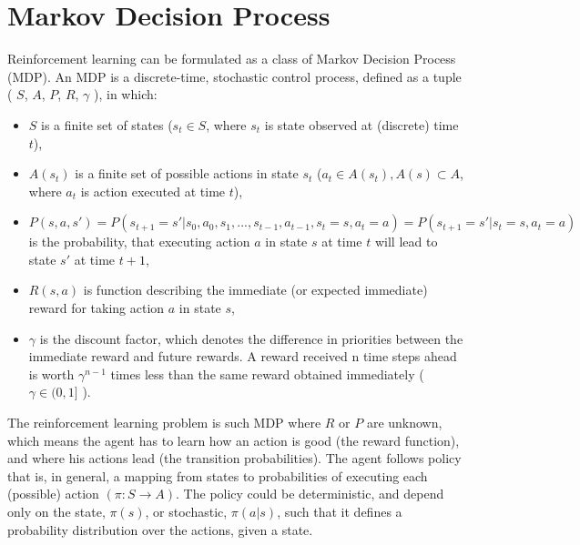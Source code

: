	\section{Markov Decision Process} \label{sec:21}
	    Reinforcement learning can be formulated as a class of Markov Decision Process (MDP). An MDP is a discrete-time, stochastic control process, defined as a tuple ( $S$, $A$, $P$, $R$, $\gamma$ ), in which:
	    \begin{itemize}
	        \item $S$ is a finite set of states ($s_t \in S$, where $s_t$ is state observed at (discrete) time $t$),
	        \item $A(s_t )$ is a finite set of possible actions in state $s_t$ ($a_t \in A(s_t ), A(s) \subset A$, where $a_t$ is action executed at time $t$),
	        \item $P (s, a, s') = P(s_{t+1}=s'|s_0, a_0, s_1,..., s_{t-1}, a_{t-1}, s_t=s, a_t=a) = P(s_{t+1}=s'|s_t=s,a_t=a)$ is the probability, that executing action $a$ in state $s$ at time $t$ will lead to state $s'$ at time $t + 1$,
	        \item $R(s, a)$ is function describing the immediate (or expected immediate) reward for taking action $a$ in state $s$,
	        \item $\gamma$ is the discount factor, which denotes the difference in priorities between the immediate reward and future rewards. A reward received n time steps ahead is worth $\gamma^{  n - 1 }$ times less than the same reward obtained immediately ( $\gamma \in (0, 1]$ ).
	    
	    \end{itemize}
	    \par
        The reinforcement learning problem is such MDP where $R$ or $P$ are unknown, which means the agent has to learn how an action is good (the reward function), and where his actions lead (the transition probabilities). The agent follows policy that is, in general, a mapping from states to probabilities of executing each (possible) action $(\pi : S \to A)$. The policy could be deterministic, and depend only on the state, $\pi(s)$, or stochastic, $\pi(a|s)$, such that it defines a probability distribution over the actions, given a state.
        
